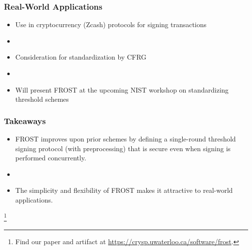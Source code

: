 \documentclass[hyperref={pdfpagelabels=true},table,dvipsnames,14pt,aspectratio=169]{beamer}
\begin{document}
\begin{frame}
  \frametitle{Real-World Applications}

  \begin{itemize}
    \item<1-> Use in cryptocurrency (Zcash) protocols for signing transactions
    \item[]
    \item<2-> Consideration for standardization by CFRG
    \item[]
    \item<3-> Will present FROST at the upcoming NIST workshop on standardizing
      threshold schemes
  \end{itemize}
\end{frame}

\begin{frame}
  \frametitle{Takeaways}
  \begin{itemize}
    \item<1-> FROST improves upon prior schemes by defining a
      single-round threshold signing protocol (with preprocessing) that is
      secure even when signing is performed concurrently.
    \item[]
    \item<2-> The simplicity and flexibility of FROST makes it attractive to
      real-world applications.
  \end{itemize}
      \let\thefootnote\relax\footnote{
      Find our paper and artifact at
      \url{https://crysp.uwaterloo.ca/software/frost}.
      }
\end{frame}

\end{document}
